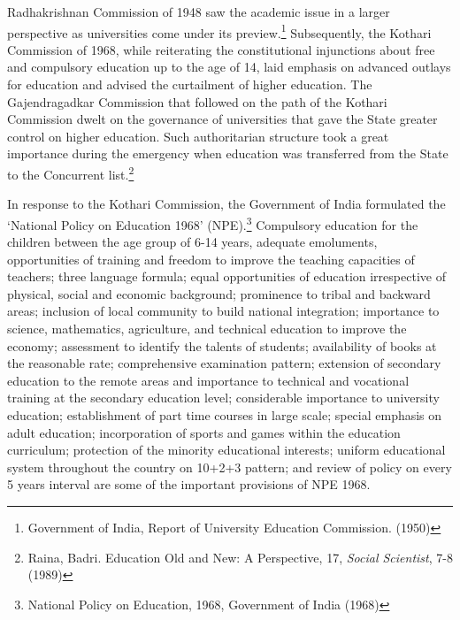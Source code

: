 \begin{multicols}{2}
\noi
Radhakrishnan Commission of 1948 saw the academic issue in a larger perspective as
universities come under its preview.\footnote{Government of India, Report of University Education Commission. (1950)} Subsequently, the Kothari Commission of 1968, while
reiterating the constitutional injunctions about free and compulsory education up to the age of
14, laid emphasis on advanced outlays for education and advised the curtailment of higher
education. The Gajendragadkar Commission that followed on the path of the Kothari
Commission dwelt on the governance of universities that gave the State greater control on
higher education. Such authoritarian structure took a great importance during the emergency
when education was transferred from the State to the Concurrent list.\footnote{ Raina, Badri. Education Old and New: A Perspective, 17, \textit{Social Scientist}, 7-8 (1989)}

\noi
In response to the Kothari Commission, the Government of India formulated the ‘National
Policy on Education 1968’ (NPE).\footnote{National Policy on Education, 1968, Government of India (1968)} Compulsory education for the children between the age
group of 6-14 years, adequate emoluments, opportunities of training and freedom to improve
the teaching capacities of teachers; three language formula; equal opportunities of education
irrespective of physical, social and economic background; prominence to tribal and backward
areas; inclusion of local community to build national integration; importance to science,
mathematics, agriculture, and technical education to improve the economy; assessment to
identify the talents of students; availability of books at the reasonable rate; comprehensive examination pattern; extension of secondary education to the remote areas and importance to
technical and vocational training at the secondary education level; considerable importance to
university education; establishment of part time courses in large scale; special emphasis on
adult education; incorporation of sports and games within the education curriculum;
protection of the minority educational interests; uniform educational system throughout the
country on 10+2+3 pattern; and review of policy on every 5 years interval are some of the
important provisions of NPE 1968.


\end{multicols}
